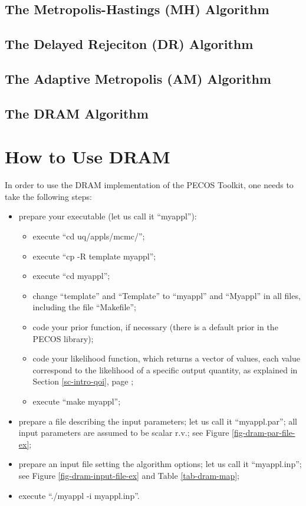 \subsection{The Metropolis-Hastings (MH) Algorithm}%

\subsection{The Delayed Rejeciton (DR) Algorithm}%

\subsection{The Adaptive Metropolis (AM) Algorithm}%

\subsection{The DRAM Algorithm}%

\section{How to Use DRAM}\label{sc-gmc-dram-how-to-use}

In order to use the DRAM implementation of the PECOS Toolkit, one needs to take the following steps:
\begin{itemize}
\item {prepare your executable (let us call it ``myappl''):
\begin{itemize}
\item execute ``cd uq/appls/mcmc/'';
\item execute ``cp -R template myappl'';
\item execute ``cd myappl'';
\item change ``template'' and ``Template'' to ``myappl'' and ``Myappl'' in all files, including the file ``Makefile'';
\item code your prior function, if necessary (there is a default prior in the PECOS library);
\item code your likelihood function, which returns a vector of values, each value correspond to the likelihood of a specific output quantity, as explained in Section \ref{sc-intro-qoi}, page \pageref{sc-intro-qoi};
\item execute ``make myappl'';
\end{itemize}
}
\item prepare a file describing the input parameters; let us call it ``myappl.par''; all input parameters are assumed to be scalar r.v.; see Figure \ref{fig-dram-par-file-ex}; 
\item prepare an input file setting the algorithm options; let us call it ``myappl.inp''; see Figure \ref{fig-dram-input-file-ex} and Table \ref{tab-dram-map};
\item execute ``./myappl -i myappl.inp''.
\end{itemize}

